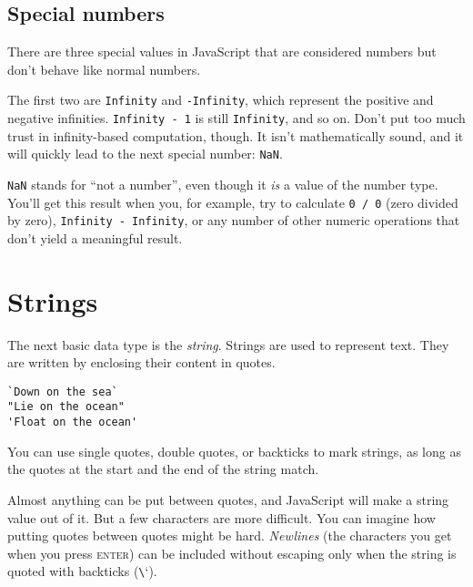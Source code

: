 \subsection{Special numbers}

There are three special values in JavaScript that are considered numbers but don't behave like normal numbers.

The first two are \lstinline`Infinity` and \lstinline`-Infinity`, which represent the positive and negative infinities. \lstinline`Infinity - 1` is still \lstinline`Infinity`, and so on. Don't put too much trust in infinity-based computation, though. It isn't mathematically sound, and it will quickly lead to the next special number: \lstinline`NaN`.

\lstinline`NaN` stands for ``not a number'', even though it \emph{is} a value of the number type. You'll get this result when you, for example, try to calculate \lstinline`0 / 0` (zero divided by zero), \lstinline`Infinity - Infinity`, or any number of other numeric operations that don't yield a meaningful result.

\section{Strings}

The next basic data type is the \emph{string}. Strings are used to represent text. They are written by enclosing their content in quotes.

\begin{lstlisting}
`Down on the sea`
"Lie on the ocean"
'Float on the ocean'
\end{lstlisting}
\noindent

You can use single quotes, double quotes, or backticks to mark strings, as long as the quotes at the start and the end of the string match.

Almost anything can be put between quotes, and JavaScript will make a string value out of it. But a few characters are more difficult. You can imagine how putting quotes between quotes might be hard. \emph{Newlines} (the characters you get when you press \textsc{enter}) can be included without escaping only when the string is quoted with backticks (\lstinline`\``).

